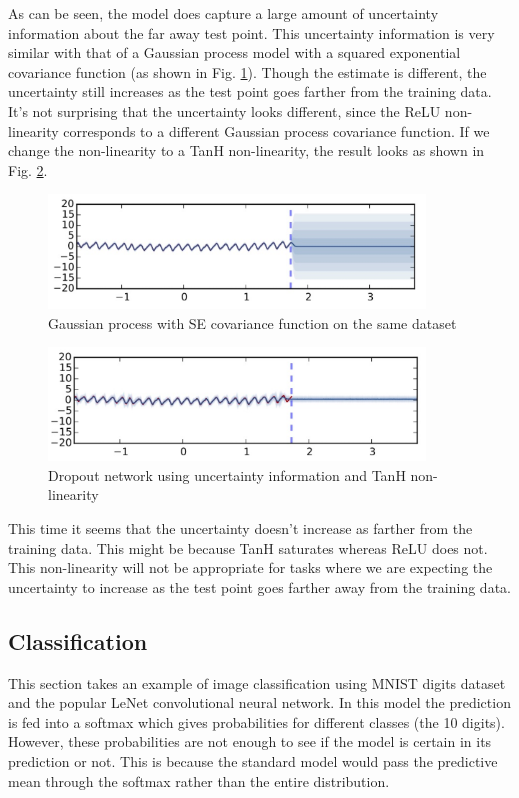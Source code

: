 As can be seen, the model does capture a large amount of uncertainty information about the far away test point. This uncertainty information is very similar with that of a Gaussian process model with a squared exponential covariance function (as shown in Fig. \ref{fig:regression_GP}). Though the estimate is different, the uncertainty still increases as the test point goes farther from the training data. It's not surprising that the uncertainty looks different, since the ReLU non-linearity corresponds to a different Gaussian process covariance function. If we change the non-linearity to a TanH non-linearity, the result looks as shown in Fig. \ref{fig:regression_tanh}.

\begin{figure}[H]
    \centering
    \includegraphics[width=10cm]{labs/12/images/Regression using Gaussian Process.png}
    \caption{Gaussian process with SE covariance function on the same dataset}
    \label{fig:regression_GP}
\end{figure}

\begin{figure}[H]
    \centering
    \includegraphics[width=10cm]{labs/12/images/Regression using TanH.png}
    \caption{Dropout network using uncertainty information and TanH non-linearity}
    \label{fig:regression_tanh}
\end{figure}

This time it seems that the uncertainty doesn't increase as farther from the training data. This might be because TanH saturates whereas ReLU does not. This non-linearity will not be appropriate for tasks where we are expecting the uncertainty to increase as the test point goes farther away from the training data.

\subsection{Classification}
This section takes an example of image classification using MNIST digits dataset and the popular LeNet convolutional neural network. In this model the prediction is fed into a softmax which gives probabilities for different classes (the 10 digits). However, these probabilities are not enough to see if the model is certain in its prediction or not. This is because the standard model would pass the predictive mean through the softmax rather than the entire distribution.

